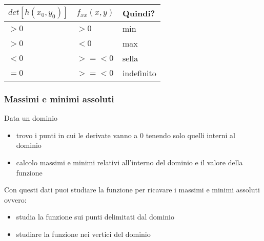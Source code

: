 \begin{center}
\begin{tabular}{l|l|l}
\toprule
{$det[h(x_0,y_0)]$} & {$f_{xx}(x,y)$} & Quindi? \\
\midrule
$>0$ & $>0$ & min \\
$>0$ & $<0$ & max \\
$<0$ & $>=<0$ & sella \\
$=0$ & $>=<0$ & indefinito\\
\bottomrule
\end{tabular}
\end{center}

\subsubsection{Massimi e minimi assoluti}
Data un dominio

\begin{itemize}
    \item{trovo i punti in cui le derivate vanno a 0 tenendo solo quelli interni al dominio}
    \item{calcolo massimi e minimi relativi all'interno del dominio e il valore della funzione}
\end{itemize}
Con questi dati puoi studiare la funzione per ricavare i massimi e minimi assoluti ovvero:	

\begin{itemize}
    \item{studia la funzione sui punti delimitati dal dominio}
    \item{studiare la funzione nei vertici del dominio}
\end{itemize}
